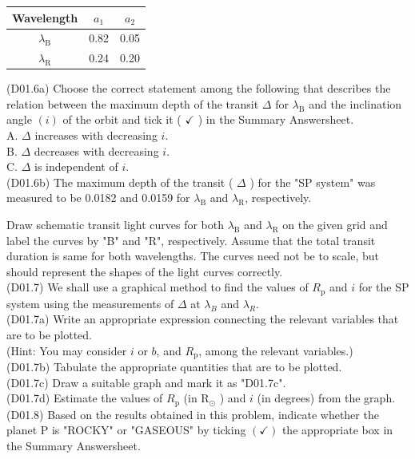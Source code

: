 \documentclass[10pt]{article}
\begin{document}
    \begin{center}
    \begin{tabular}{|c|c|c|}
    \hline
    Wavelength & $a_{1}$ & $a_{2}$ \\
    \hline
    $\lambda_{\mathrm{B}}$ & 0.82 & 0.05 \\
    \hline
    $\lambda_{\mathrm{R}}$ & 0.24 & 0.20 \\
    \hline
    \end{tabular}
    \end{center}
    
    (D01.6a) Choose the correct statement among the following that describes the relation between the maximum depth of the transit $\Delta$ for $\lambda_{\mathrm{B}}$ and the inclination angle $(i)$ of the orbit and tick it ( $\boldsymbol{\checkmark}$ ) in the Summary Answersheet.\\
    A. $\Delta$ increases with decreasing $i$.\\
    B. $\Delta$ decreases with decreasing $i$.\\
    C. $\Delta$ is independent of $i$.\\
    (D01.6b) The maximum depth of the transit ( $\Delta$ ) for the "SP system" was measured to be 0.0182 and 0.0159 for $\lambda_{\mathrm{B}}$ and $\lambda_{\mathrm{R}}$, respectively.
    
    Draw schematic transit light curves for both $\lambda_{\mathrm{B}}$ and $\lambda_{\mathrm{R}}$ on the given grid and label the curves by "B" and "R", respectively. Assume that the total transit duration is same for both wavelengths. The curves need not be to scale, but should represent the shapes of the light curves correctly.\\
    (D01.7) We shall use a graphical method to find the values of $R_{\mathrm{p}}$ and $i$ for the SP system using the measurements of $\Delta$ at $\lambda_{B}$ and $\lambda_{R}$.\\
    (D01.7a) Write an appropriate expression connecting the relevant variables that are to be plotted.\\
    (Hint: You may consider $i$ or $b$, and $R_{\mathrm{p}}$, among the relevant variables.)\\
    (D01.7b) Tabulate the appropriate quantities that are to be plotted.\\
    (D01.7c) Draw a suitable graph and mark it as "D01.7c".\\
    (D01.7d) Estimate the values of $R_{\mathrm{p}}$ (in $\mathrm{R}_{\odot}$ ) and $i$ (in degrees) from the graph.\\
    (D01.8) Based on the results obtained in this problem, indicate whether the planet P is "ROCKY" or "GASEOUS" by ticking $(\checkmark)$ the appropriate box in the Summary Answersheet.
\end{document}
